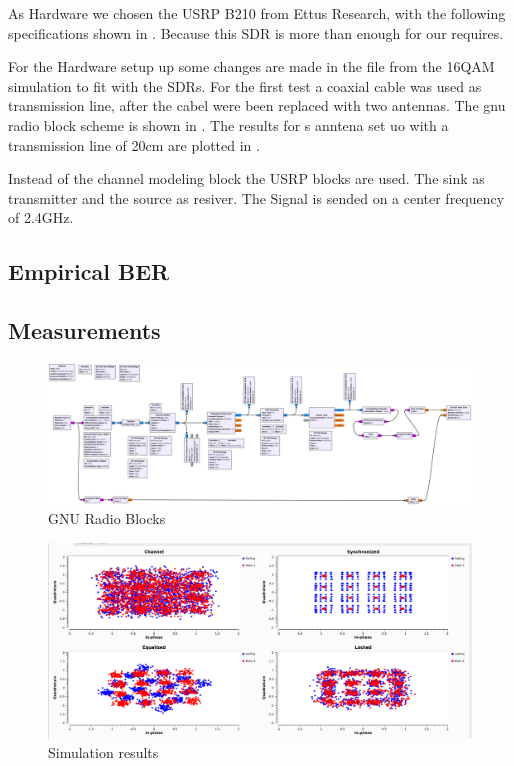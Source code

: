 As Hardware we chosen the USRP B210 from Ettus Research, with the following specifications shown in . Because this SDR is more than enough for our requires.

For the Hardware setup up some changes are made in the file from the 16QAM simulation to fit with the SDRs. For the first test a coaxial cable was used as transmission line, after the cabel were been replaced with two antennas. The gnu radio block scheme is shown in . The results for s anntena set uo with a transmission line of 20cm  are plotted in .

Instead of the channel modeling block the USRP blocks are used. The sink as transmitter and the source as resiver.  The Signal is sended on a center frequency of 2.4GHz.

\subsection{Empirical BER} \label{sec:ber}

\subsection{Measurements}

%
%
%

\begin{figure}
	\includegraphics[width=\linewidth]{./figures/pdfs/qam_nogui.pdf}
	\caption{GNU Radio Blocks}
	\label{fig:simul16QAM_block}	
\end{figure}

\begin{figure}
	\includegraphics[width=\linewidth]{./figures/screenshots/QAM16_Fading_2.png}
	\caption{Simulation results}
	\label{fig:simul16QAM}	
\end{figure}

